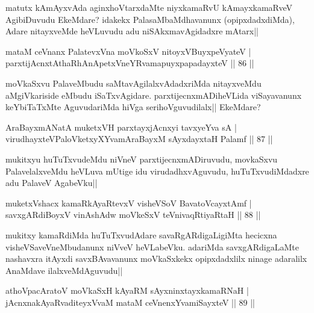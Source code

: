 \begin{artha}
matutx kAmAyxvAda aginxhoVtarxdaMte niyxkamaRvU kAmayxkamaRveV AgibiDuvudu EkeMdare? idakekx PalasaMbaMdhavanunx (opipxdadxdiMda), Adare nitayxveMde heVLuvudu adu niSAkxmavAgidadxre mAtarx||
\end{artha}

\begin{shl}
mataM ceVnanx PalatevxVna moVkoSxV nitoyxV\s BuyxpeVyateV |\\
parxtijAcnxtAthaRhAnApetxVneYRvamapuyxpapadayxteV \hfill || 86 ||
\end{shl}

\begin{artha}
moVkaSxvu PalaveMbudu saMtavAgilalxvAdadxriMda nitayxveMdu aMgiVkariside eMbudu iSaTxvAgidare. parxtijecnxmADiheVLida viSayavanunx keYbiTaTxMte AguvudariMda hiVga serihoVguvudilalx|| EkeMdare?
\end{artha}

\begin{shl}
AraBayxmANatA muketxVH parxtayxjAcnxyi tavxyeYva sA |\\
virudhayxteV\s PaloVketxyXYvamAraBayxM sAyxdayxtaH Palamf \hfill || 87 ||
\end{shl}

\begin{artha}
mukitxyu huTuTxvudeMdu niVneV parxtijecnxmADiruvudu, movkaSxvu PalavelalxveMdu heVLuva mUtige idu virudadhxvAguvudu, huTuTxvudiMdadxre adu PalaveV AgabeVku||
\end{artha}

\begin{shl}
muketxVshacx kamaRkAyaRtevxV visheVSoV BavatoVcayxtAmf |\\
savxgARdiBoyxV vinAshAdw moVkeSxV teV\s nivaqRtiyaRtaH \hfill || 88 ||
\end{shl}

\begin{artha}
mukitxy kamaRdiMda huTuTxvudAdare savaRgARdigaLigiMta hecicxna visheVSaveVneMbudanunx niVveV heVLabeVku. adariMda savxgARdigaLaMte nashavxra itAyxdi savxBAvavanunx moVkaSxkekx opipxdadxlilx ninage adaralilx AnaMdave ilalxveMdAguvudu||
\end{artha}

\begin{shl}
athoVpacAratoV moVkaSxH kAyaRM sAyxninxtayxkamaRNaH |\\
jAcnxnakAyaRvaditeyxVvaM mataM ceVnenxYvamiSayxteV \hfill || 89 ||
\end{shl}

